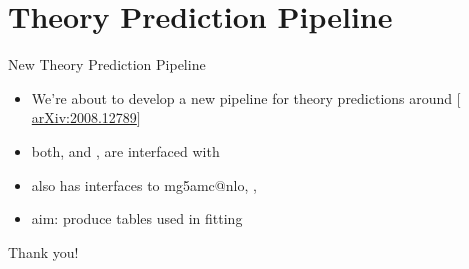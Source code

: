 \documentclass[10pt, usepdftitle=false]{beamer}
\makeatletter
\providecommand{\iRef}[1]{{\color{mLightGreen}\small $[$#1$]$}}
\newcommand\klammeraffe{@}
\makeatother
\begin{document}
\section{Theory Prediction Pipeline}

\begin{frame}{New Theory Prediction Pipeline}
	\begin{itemize}
		\item We're about to develop a new pipeline for theory predictions around \pineappl{} \iRef{\href{https://arxiv.org/abs/2008.12789}{arXiv:2008.12789}}
		\item both, \eko{} and \yadism{}, are interfaced with \pineappl{}
		\item \pineappl{} also has interfaces to {\abbrev mg5amc{\klammeraffe}nlo}, \appl{}, \fastnlo{}
		\item aim: produce \fk{} tables used in \pdf{} fitting
	\end{itemize}
\end{frame}


\begin{frame}[standout]
	Thank you!
\end{frame}
\end{document}
